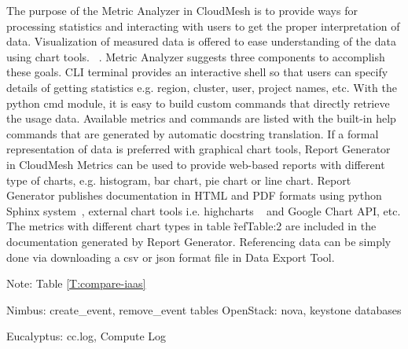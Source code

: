 \documentclass{tex/sig-alternate}
\begin{document}
{The purpose of the Metric Analyzer in CloudMesh is to provide ways for
processing statistics and interacting with users to get the proper
interpretation of data. Visualization of measured data is offered to
ease understanding of the data using chart
tools. ~\cite{kosslyn1989understanding,pinker1990theory,friel2001making}. Metric
Analyzer suggests three components to accomplish these goals. CLI
terminal provides an interactive shell so that users can specify
details of getting statistics e.g. region, cluster, user, project
names, etc. With the python cmd module, it is easy to build custom
commands that directly retrieve the usage data. Available metrics and
commands are listed with the built-in help commands that are generated
by automatic docstring translation. If a formal representation of data
is preferred with graphical chart tools, Report Generator in CloudMesh
Metrics can be used to provide web-based reports with different type
of charts, e.g. histogram, bar chart, pie chart or line chart. Report
Generator publishes documentation in HTML and PDF formats using python
Sphinx system~\cite{brandl2009sphinx}, external chart tools
i.e. highcharts ~\cite{highsoft2012highcharts} and Google Chart API,
etc. The metrics with different chart types in table \~ref{Table:2}
are included in the documentation generated by Report
Generator. Referencing data can be simply done via downloading a csv
or json format file in Data Export Tool.




Note:
Table \ref{T:compare-iaas}

    Nimbus: create\_event, remove\_event tables 
    OpenStack: nova, keystone  databases 

    Eucalyptus: cc.log, Compute Log 


\newcommand{\YES}{\ding{51}}

\newcommand{\NO}{\ding{55}}


}
\end{document}

